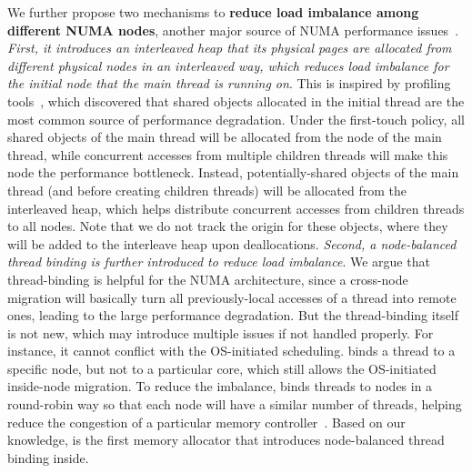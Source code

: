 We further propose two mechanisms to \textbf{reduce load imbalance among different NUMA nodes}, another major source of NUMA performance issues~\cite{Dashti:2013:TMH:2451116.2451157}. \textit{First, it introduces an interleaved heap that its physical pages are allocated from different physical nodes in an interleaved way, which reduces load imbalance for the initial node that the main thread is running on}. This is inspired by profiling tools~\cite{XULIU, MemProf}, which discovered that shared objects allocated in the initial thread are the most common source of performance degradation. Under the first-touch policy, all shared objects of the main thread will be allocated from the node of the main thread, while concurrent accesses from multiple children threads will make this node the performance bottleneck. 
Instead, potentially-shared objects of the main thread (and before creating children threads) will be allocated from the interleaved heap, which helps distribute concurrent accesses from children threads to all nodes. Note that we do not track the origin for these objects, where they will be added to the interleave heap upon deallocations. \textit{Second,  a node-balanced thread binding is further introduced to reduce load imbalance}. We argue that thread-binding is helpful for the NUMA architecture, since a cross-node migration will basically turn all previously-local accesses of a thread into remote ones, leading to the large performance degradation. But the thread-binding itself is not new, which may introduce multiple issues if not handled properly. For instance, it cannot conflict with the OS-initiated scheduling. \NM{} binds a thread to a specific node, but not to a particular core, which still allows the OS-initiated inside-node migration. 
To reduce the imbalance, \NM{} binds threads to nodes in a round-robin way so that each node will have a similar number of threads, helping reduce the congestion of a particular memory controller~\cite{Blagodurov:2011:CNC:2002181.2002182}. Based on our knowledge, \NM{} is the first memory allocator that introduces node-balanced thread binding inside. 

 
